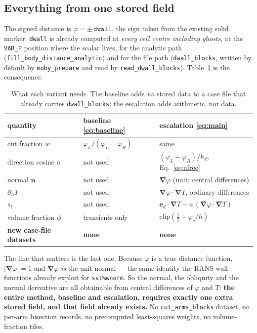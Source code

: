 \documentclass[11pt,a4paper]{article}
\newcommand{\ed}{\boldsymbol{e}_d}
\newcommand{\nn}{\boldsymbol{n}}
\newcommand{\grad}{\boldsymbol{\nabla}}
\newcommand{\code}[1]{\texttt{#1}}
\begin{document}
\subsection{Everything from one stored field}
\label{sec:onefield}

The signed distance is $\varphi=\pm\,\code{dwall}$, the sign taken from the
existing solid marker. \code{dwall} is already computed at \emph{every cell
centre including ghosts}, at the \code{VAR\_P} position where the scalar lives,
for the analytic path (\code{fill\_body\_distance\_analytic}) and for the file
path (\code{dwall\_blocks}, written by default by \code{moby\_prepare} and read
by \code{read\_dwall\_blocks}). Table~\ref{tab:needs} is the consequence.

\begin{table}[htbp]
\centering
\caption{What each variant needs. The baseline adds \emph{no} stored data to a
case file that already carries \code{dwall\_blocks}; the escalation adds
arithmetic, not data.}
\label{tab:needs}
\small
\begin{tabular}{@{}lll@{}}
\toprule
quantity & baseline \eqref{eq:baseline} & escalation \eqref{eq:main} \\
\midrule
cut fraction $w$ & $\varphi_L/(\varphi_L-\varphi_R)$ & same \\
direction cosine $a$ & not used & $(\varphi_L-\varphi_R)/h_d$, Eq.~\eqref{eq:afree} \\
normal $\nn$ & not used & $\grad\varphi$ (unit; central differences) \\
$\partial_nT$ & not used & $\grad\varphi\cdot\grad T$, ordinary differences \\
$s_t$ & not used & $\ed\cdot\grad T-a\,(\grad\varphi\cdot\grad T)$ \\
volume fraction $\phi$ & transients only & $\mathrm{clip}(\tfrac12+\varphi_c/h)$ \\
\midrule
\textbf{new case-file datasets} & \textbf{none} & \textbf{none} \\
\bottomrule
\end{tabular}
\end{table}

The line that matters is the last one. Because $\varphi$ is a true distance
function, $|\grad\varphi|=1$ and $\grad\varphi$ \emph{is} the unit normal --- the
same identity the RANS wall functions already exploit for \code{sst\%wnorm}. So
the normal, the obliquity and the normal derivative are all obtainable from
central differences of $\varphi$ and $T$: \textbf{the entire method, baseline
and escalation, requires exactly one extra stored field, and that field already
exists.} No \code{cut\_arms\_blocks} dataset, no per-arm bisection records, no
precomputed least-squares weights, no volume-fraction tiles.
\end{document}
